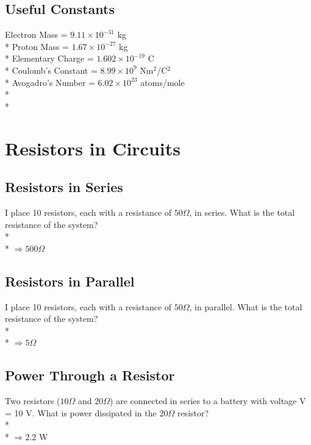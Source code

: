 \documentclass[11pt]{article}
\begin{document}
\maketitle
\tableofcontents
\vspace{50pt}

\subsection*{Useful Constants}
Electron Mass = $9.11 \times 10^{-31}$ kg \\*
Proton Mass = $1.67 \times 10^{-27}$ kg \\*
Elementary Charge = $1.602 \times 10^{-19}$ C \\*
Coulomb's Constant = $8.99 \times 10^9$ Nm$^2$/C$^2$ \\*
Avogadro's Number = $ 6.02 \times 10^{23}$ atoms/mole \\*\\*


\pagebreak
\section{Resistors in Circuits}
\vspace{10pt}

\subsection{Resistors in Series}
I place 10 resistors, each with a resistance of $50 \Omega$, in series.  What is the total resistance of the system?\\* \\*
$\Rightarrow 500 \Omega$

\subsection{Resistors in Parallel}
I place 10 resistors, each with a resistance of $50 \Omega$, in parallel.  What is the total resistance of the system?\\* \\*
$\Rightarrow 5 \Omega$

\subsection{Power Through a Resistor}
Two resistors ($10\Omega$ and $20\Omega$) are connected in series to a battery with voltage V = 10 V.  What is power dissipated in the $20\Omega$ resistor?\\* \\*
$\Rightarrow 2.2$ W
\end{document}
